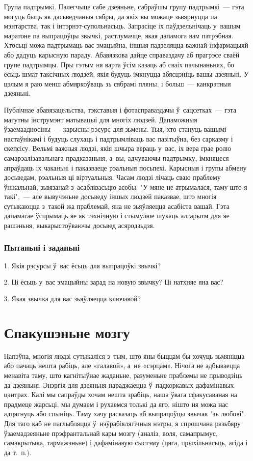 Група падтрымкі. Палегчыце сабе дзеяньне, сабраўшы групу падтрымкі~--- гэта могуць быць як дасьведчаныя сябры, да якіх вы можаце зьвярнуцца па мэнтарства, так і інтэрнэт-супольнасьць. Запрасіце іх паўдзельнічаць у~вашым маратоне па выпрацоўцы звычкі, растлумачце, якая дапамога вам патрэбная. Хтосьці можа падтрымаць вас эмацыйна, іншыя падзеляцца важнай інфармацыяй або дадуць карысную параду. Абавязкова дайце справаздачу аб прагрэсе сваёй групе падтрымцы. Пры гэтым ня варта ўсім казаць аб сваіх пачынаньнях, бо ёсьць шмат таксічных людзей, якія будуць імкнуцца абясцэніць вашы дзеяньні. У цэлым я раю менш абмяркоўваць зь сябрамі пляны, і больш~--- канкрэтныя дзеяньні. 

Публічнае абавязацельства, тэкставыя і фотасправаздачы ў~сацсетках~--- гэта магутны інструмэнт матывацыі для многіх людзей. Дапаможныя ўзаемаадносіны~--- карысны рэсурс для зьмены. Тыя, хто стануць вашымі настаўнікамі і будуць слухаць і падтрымліваць вас пазітыўна, без сарказму і скепсісу. Вельмі важныя людзі, якія шчыра вераць у~вас, іх вера грае ролю самарэалізавальнага прадказаньня, а~вы, адчуваючы падтрымку, імкняцеся апраўдаць іх чаканьні і паказваеце рэальныя посьпехі. Карысныя і групы абмену досьведам, рэальныя ці віртуальныя. Часам людзі лічаць сваю праблему ўнікальнай, зьвязанай з~асаблівасьцю асобы: "У мяне не атрымалася, таму што я такі",~--- але вывучэньне досьведу іншых людзей паказвае, што многія сутыкаюцца з~такой жа праблемай, яна не зьяўляецца асабіста вашай. Гэта дапамагае ўспрымаць яе як тэхнічную і стымулюе шукаць алгарытм для яе рашэньня, выкарыстоўваючы досьвед асяродзьдзя.

\subsubsection{Пытаньні і заданьні}

1. Якія рэсурсы ў~вас ёсьць для выпрацоўкі звычкі?

2. Ці ёсьць у~вас эмацыйны зарад на новую звычку? Ці натхняе яна вас?

3. Якая звычка для вас зьяўляецца ключавой?


\section{Спакушэньне мозгу}

Напэўна, многія людзі сутыкаліся з~тым, што яны быццам бы хочуць зьмяніцца або пачаць нешта рабіць, але «галавой», а~не «сэрцам». Нічога не адбываецца менавіта таму, што кагнітыўнае жаданьне, разуменьне праблемы не прыводзіць да дзеяньня. Энэргія для дзеяньня нараджаецца ў~падкоркавых дафамінавых цэнтрах. Калі мы сапраўды хочам нешта зрабіць, наша ўвага сфакусаваная на прадмеце жарсьці, мы думаем і рухаемся толькі да яго, нішто ня можа нас адцягнуць або спыніць. Таму хачу расказаць аб выпрацоўцы звычак "зь любові". Для таго каб не паглыбляцца ў~нэўрабіялягічныя нэтры, я спрошчана разьбяру ўзаемадзеяньне прэфрантальнай кары мозгу (аналіз, воля, самапрымус, самакрытыка, тармажэньне) і дафамінавую сыстэму (цяга, прыхільнасьць, агіда і да т.~п.).

